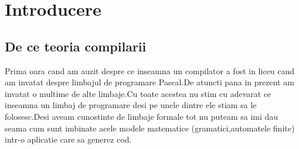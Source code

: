 
\chapter{Introducere} %

\label{Chapter1} %



\section{De ce teoria compilarii}
	Prima oara cand am auzit despre ce inseamna un compilator a fost in liceu cand am invatat despre
	limbajul de programare Pascal.De atuncti pana in prezent am invatat o multime de alte limbaje.Cu 
	toate acestea nu stim cu adevarat ce inseamna un limbaj de programare desi pe unele dintre ele
	stiam sa le folosesc.Desi aveam cunostinte de limbaje formale tot nu puteam sa imi dau seama cum
	sunt imbinate acele modele matematice (gramatici,automatele finite) intr-o aplicatie care sa 
	generez cod.
	
		
	
	



